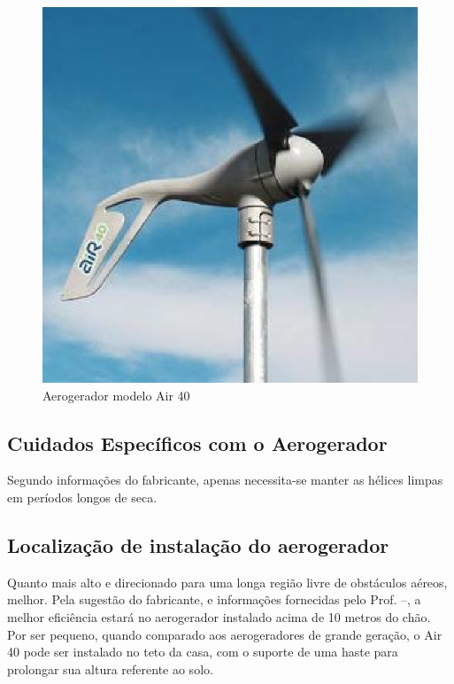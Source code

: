 \begin{figure}[H]
  \begin{center}
	\includegraphics[keepaspectratio,scale=0.5]{figuras/air_40.eps}
	\caption{Aerogerador modelo Air 40}
  \end{center}
\end{figure}


\subsection{Cuidados Específicos com o Aerogerador}

	Segundo informações do fabricante, apenas necessita-se manter as hélices limpas em períodos longos de seca.

\subsection{Localização de instalação do aerogerador}

	Quanto mais alto e direcionado para uma longa região livre de obstáculos aéreos, melhor. Pela sugestão do fabricante, e informações fornecidas pelo Prof. \cite{CORMANE} --, a melhor eficiência estará no aerogerador instalado acima de 10 metros do chão. Por ser pequeno, quando comparado aos aerogeradores de grande geração, o Air 40 pode ser instalado no teto da casa, com o suporte de uma haste para prolongar sua altura referente ao solo.

